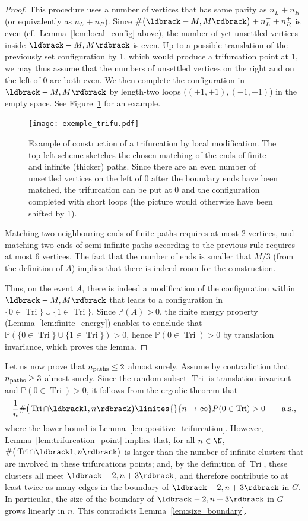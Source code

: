 \documentclass[12pt]{amsart}
\newcommand{\prob}{\mathbb{P}}
\DeclareMathOperator{\Tri}{Tri}
\newcommand{\npath}{n_{\rm paths}}
\theoremstyle{remark}
\newcommand{\Li}{\ldbrack} %
\newcommand{\Ri}{\rdbrack}
\begin{document}
\begin{proof}
This procedure uses a number of vertices that has same parity as $n^+_L+n^+_R$ (or equivalently as $n^-_L+n^-_R$). Since $\#\big(\Li-M,M\Ri\big)+n^+_L+n^+_R$ is even (cf.~Lemma~\ref{lem:local_config} above), the number of yet unsettled vertices inside $\Li-M,M\Ri$ is even. 
Up to a possible translation of the previously set configuration by 1, which would produce a trifurcation point at 1, we may thus assume that the numbers of unsettled vertices on the right and on the left of 0 are both even. We then complete the configuration in $\Li-M,M\Ri$ by length-two loops ($(+1,+1),(-1,-1)$) in the empty space. See Figure~\ref{fig:exemple_trifu} for an example.
\begin{figure}
\texttt{[image: exemple\_trifu.pdf]}
\caption{Example of construction of a trifurcation by local modification. The top left scheme sketches the chosen matching of the ends of finite and infinite (thicker) paths. 
Since there are an even number of unsettled vertices on the left of 0 after the boundary ends have been matched, the trifurcation can be put at 0 and the configuration completed with short loops (the picture would otherwise have been shifted by 1).}
\label{fig:exemple_trifu}
\end{figure}


Matching two neighbouring ends of finite paths requires at most 2 vertices, and matching two ends of semi-infinite paths according to the previous rule requires at most 6 vertices. The fact that the number of ends is smaller that $M/{3}$ (from the definition of $A$) implies that there is indeed room for the construction.

Thus, on the event $A$, there is indeed a modification of the configuration within $\Li-M,M\Ri$ that leads to a configuration in $\{0\in \Tri\}\cup\{1\in \Tri\}$. Since $\prob(A)>0$, the finite energy property (Lemma~\ref{lem:finite_energy}) enables to conclude that $\prob(\{0\in \Tri\}\cup\{1\in \Tri\})>0$, hence $\prob(0\in \Tri)>0$ by translation invariance, which proves the lemma. 
\end{proof}

Let us now prove that $\npath \leq 2$ almost surely. Assume by contradiction that $\npath\ge3$ almost surely. Since the random subset $ \Tri$ is translation invariant and $\prob(0\in  \Tri)>0$, it follows from the ergodic theorem that 
\[\frac1n\#\big( \Tri\cap\Li1,n\Ri\big)\limites{}{n\to\infty}P(0\in  \Tri)>0\qquad\text{a.s.,}\]
where the lower bound is Lemma~\ref{lem:positive_trifurcation}. However, Lemma~\ref{lem:trifurcation_point} implies that, for all $n\in\N$, $\#\big( \Tri\cap\Li1,n\Ri\big)$ is larger than the number of infinite clusters that are involved in these trifurcations points; and, by the definition of $ \Tri$, these clusters all meet $\Li-2,n+3\Ri$, and therefore contribute to at least twice as many edges in the boundary of $\Li-2,n+3\Ri$ in $G$. In particular, the size of the boundary of $\Li-2,n+3\Ri$ in $G$ grows linearly in $n$. This contradicts Lemma~\ref{lem:size_boundary}.
\end{document}
